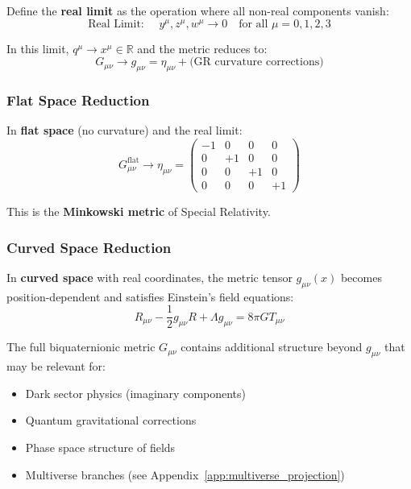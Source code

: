Define the \textbf{real limit} as the operation where all non-real components vanish:
\begin{equation}
\text{Real Limit: } \quad y^{\mu}, z^{\mu}, w^{\mu} \to 0 \quad \text{for all } \mu = 0,1,2,3
\end{equation}

In this limit, $q^{\mu} \to x^{\mu} \in \mathbb{R}$ and the metric reduces to:
\begin{equation}
G_{\mu\nu} \to g_{\mu\nu} = \eta_{\mu\nu} + \text{(GR curvature corrections)}
\end{equation}

\subsubsection{Flat Space Reduction}

In \textbf{flat space} (no curvature) and the real limit:
\begin{equation}
G_{\mu\nu}^{\text{flat}} \to \eta_{\mu\nu} = \begin{pmatrix}
-1 & 0 & 0 & 0 \\
0 & +1 & 0 & 0 \\
0 & 0 & +1 & 0 \\
0 & 0 & 0 & +1
\end{pmatrix}
\end{equation}

This is the \textbf{Minkowski metric} of Special Relativity.

\subsubsection{Curved Space Reduction}

In \textbf{curved space} with real coordinates, the metric tensor $g_{\mu\nu}(x)$ becomes position-dependent and satisfies Einstein's field equations:
\begin{equation}
R_{\mu\nu} - \frac{1}{2} g_{\mu\nu} R + \Lambda g_{\mu\nu} = 8\pi G T_{\mu\nu}
\end{equation}

The full biquaternionic metric $G_{\mu\nu}$ contains additional structure beyond $g_{\mu\nu}$ that may be relevant for:
\begin{itemize}
\item Dark sector physics (imaginary components)
\item Quantum gravitational corrections
\item Phase space structure of fields
\item Multiverse branches (see Appendix~\ref{app:multiverse_projection})
\end{itemize}

